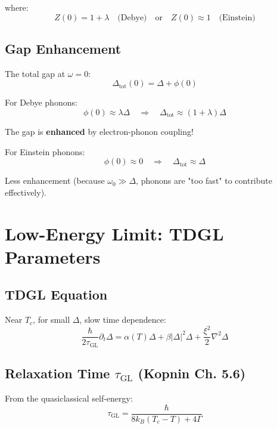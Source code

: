 \documentclass[12pt]{article}
\begin{document}
where:
\begin{equation}
\boxed{
Z(0) = 1 + \lambda \quad \text{(Debye)} \quad \text{or} \quad Z(0) \approx 1 \quad \text{(Einstein)}
}
\end{equation}

\subsection{Gap Enhancement}

The total gap at $\omega = 0$:
\begin{equation}
\Delta_{\text{tot}}(0) = \Delta + \phi(0)
\end{equation}

For Debye phonons:
\begin{equation}
\phi(0) \approx \lambda \Delta \quad \Rightarrow \quad \Delta_{\text{tot}} \approx (1 + \lambda)\Delta
\end{equation}

The gap is \textbf{enhanced} by electron-phonon coupling!

For Einstein phonons:
\begin{equation}
\phi(0) \approx 0 \quad \Rightarrow \quad \Delta_{\text{tot}} \approx \Delta
\end{equation}

Less enhancement (because $\omega_0 \gg \Delta$, phonons are "too fast" to contribute effectively).

\section{Low-Energy Limit: TDGL Parameters}

\subsection{TDGL Equation}

Near $T_c$, for small $\Delta$, slow time dependence:
\begin{equation}
\boxed{
\frac{\hbar}{2\tau_{\text{GL}}} \partial_t \Delta = \alpha(T) \Delta + \beta |\Delta|^2 \Delta + \frac{\xi^2}{2}\nabla^2\Delta
}
\end{equation}

\subsection{Relaxation Time $\tau_{\text{GL}}$ (Kopnin Ch. 5.6)}

From the quasiclassical self-energy:
\begin{equation}
\boxed{
\tau_{\text{GL}} = \frac{\hbar}{8k_B(T_c - T) + 4\Gamma}
}
\end{equation}
\end{document}
